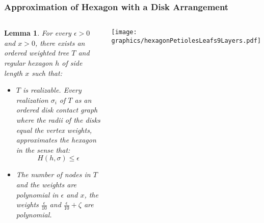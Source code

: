 \documentclass{beamer}
\newtheorem{lem}{Lemma}
\newcommand{\lr}[1]{\left( #1 \right)}
\begin{document}
\begin{frame} \frametitle{Approximation of Hexagon with a Disk Arrangement}
    \begin{columns}[c]
        \begin{lem}
            For every $\epsilon > 0$ and $x>0$, there exists an ordered weighted tree $T$ and regular hexagon $h$ of side length $x$ such that:
            \begin{itemize}
            \item[*] $T$ is realizable.  Every realization $\sigma_i$ of $T$ as an ordered disk contact graph where the radii of the disks equal the vertex weights, approximates the hexagon in the sense that:
            $$H\lr{h,\sigma}\leq\epsilon$$
            \item[*] The number of nodes in $T$ and the weights are polynomial in $\epsilon$ and $x$, the weights $\frac{\epsilon}{10}$ and $\frac{\epsilon}{10} + \zeta$ are polynomial.
            \end{itemize}
        \end{lem}   
        \begin{minipage}{\linewidth}
            \begin{center}
            \texttt{[image: graphics/hexagonPetiolesLeafs9Layers.pdf]}
            \end{center}
        \end{minipage}
    \end{columns}
\end{frame}
\end{document}
